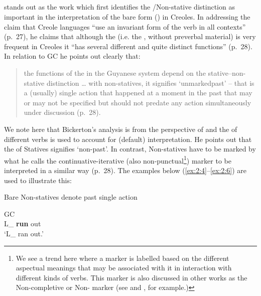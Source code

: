 \subsection{\citet{Bickerton1975}}\label{sec:2.1.3}

\citet{Bickerton1975} stands out as the work which first identifies
the \slash Non-stative distinction as important in the interpretation
of the bare form () in Creoles.  In addressing the claim
that Creole languages ``use an invariant form of the verb in all
contexts” (p.~27), he claims that although the  (i.e. the
, without preverbal material) is very frequent in Creoles
it “has several different and quite distinct functions” (p.~28).  In
relation to GC he points out clearly that:

\begin{quote}
the functions of the  in the Guyanese system depend on the
sta\-tive--non-stative distinction … with non-statives, it signifies
`unmarked\linebreak past' – that is a (usually) single action that happened at a
moment in the past that may or may not be specified but should not
predate any action simultaneously under discussion (p.~28).
\end{quote}

We note here that Bickerton’s analysis is from the perspective of
 and the  of different verbs is used to account
for (default)  interpretation.  He points out that the 
of Statives signifies `non-past'.  In contrast, Non-statives have to
be marked by what he calls the continuative-iterative (also
non-punctual\footnote{We see a trend here where a marker is labelled
  based on the different aspectual meanings that may be associated
  with it in interaction with different kinds of verbs. This marker is
  also discussed in other works as the Non-completive or
  Non- marker (see \citet{Voorhoeve1957} and
  \citet{Alleyne1980}, for example.)}) marker to be interpreted in a
similar way (p.~28).  The examples below
(\ref{ex:2:4}--\ref{ex:2:6}) are used to illustrate this:

\ea\label{ex:2:4}Bare Non-statives denote past single action \citep[29]{Bickerton1975}

\ea
GC\\
L\_ \textbf{run} out\\
\glt `L\_ ran out.'

